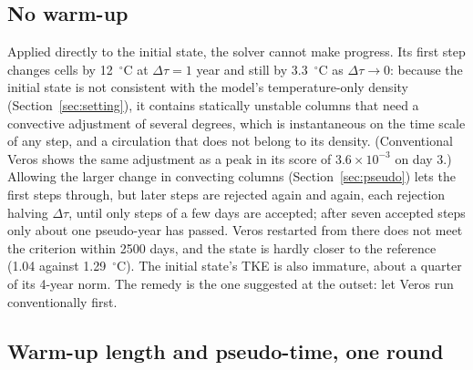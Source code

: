 \documentclass{article}
\begin{document}
\subsection{No warm-up}

Applied directly to the initial state, the solver cannot make progress. Its first step changes cells by 12~$^\circ$C at $\Delta\tau=1$ year and still by 3.3~$^\circ$C as $\Delta\tau\to0$: because the initial state is not consistent with the model's temperature-only density (Section~\ref{sec:setting}), it contains statically unstable columns that need a convective adjustment of several degrees, which is instantaneous on the time scale of any step, and a circulation that does not belong to its density. (Conventional Veros shows the same adjustment as a peak in its score of $3.6\times10^{-3}$ on day 3.) Allowing the larger change in convecting columns (Section~\ref{sec:pseudo}) lets the first steps through, but later steps are rejected again and again, each rejection halving $\Delta\tau$, until only steps of a few days are accepted; after seven accepted steps only about one pseudo-year has passed. Veros restarted from there does not meet the criterion within 2500 days, and the state is hardly closer to the reference (1.04 against 1.29~$^\circ$C). The initial state's TKE is also immature, about a quarter of its 4-year norm. The remedy is the one suggested at the outset: let Veros run conventionally first.

\subsection{Warm-up length and pseudo-time, one round}\label{sec:scan}
\end{document}
